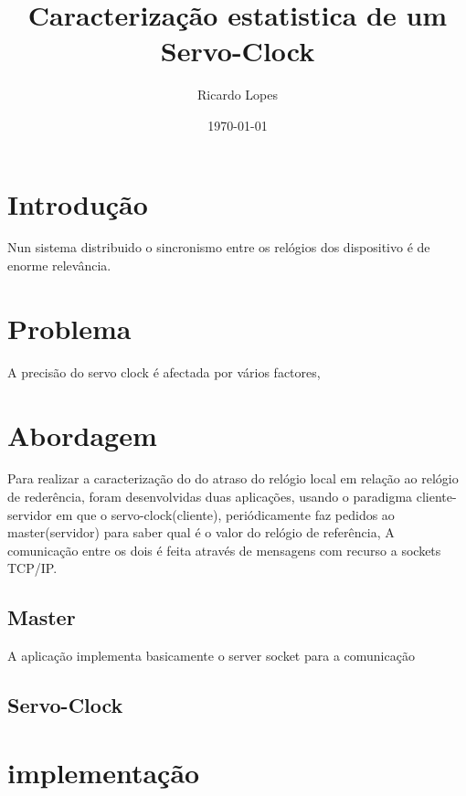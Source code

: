 \documentclass[ident=true,pt,pdftex,11pt,a4paper]{skrapport}
\begin{document}
    \begin{titlepage}
        \author[ee08001@fe.up.pt]{Ricardo Lopes}
        \date{\today}
        \title{Caracterização estatistica de um Servo-Clock}
        \maketitle
        \tableofcontent
    \end{titlepage}
    \section{Introdução}
        Nun sistema distribuido o sincronismo entre os relógios dos dispositivo é de enorme relevância.
    \section{Problema}
        A precisão do servo clock é afectada por vários factores, 
    \section{Abordagem}
       Para realizar a caracterização do do atraso do relógio local em relação ao relógio de rederência, foram desenvolvidas duas aplicações, usando o paradigma cliente-servidor
       em que o servo-clock(cliente), periódicamente faz pedidos ao master(servidor) para saber qual é o valor do relógio de referência, A comunicação entre os dois é feita 
       através de mensagens com recurso a sockets TCP/IP.
    \subsection{Master}
        A aplicação implementa basicamente o server socket para a comunicação
    \subsection{Servo-Clock}
    \section{implementação}

     
\end{document}

